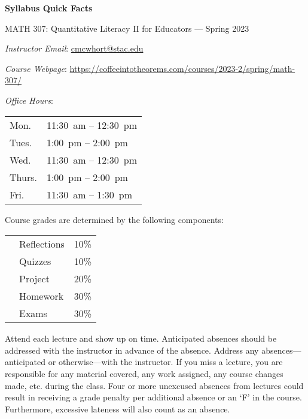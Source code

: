 \documentclass[11pt,letterpaper]{article}
\begin{document}
\begin{center} 
\bfseries
\color{stacred}
\LARGE Syllabus Quick Facts \par\vspace{0.2\baselineskip}
\Large MATH 307: Quantitative Literacy II for Educators --- Spring 2023
\end{center} 


\hspace{0.53cm} {\itshape Instructor Email}: \href{mailto:cmcwhort@stac.edu}{cmcwhort@stac.edu} \par
\hspace{0.53cm} {\itshape Course Webpage}: \href{https://coffeeintotheorems.com/courses/2023-2/spring/math-307/}{https://coffeeintotheorems.com/courses/2023-2/spring/math-307/} \par
\hspace{0.53cm} {\itshape Office Hours}: 	\par \vspace{-0.3cm}
	\begin{table}[!ht]
	\centering
	\begin{tabular}{l || l}
	Mon. & 11:30~am -- 12:30~pm \\
	Tues. & 1:00~pm -- 2:00~pm \\
	Wed. & 11:30~am -- 12:30~pm \\
	Thurs. & 1:00~pm -- 2:00~pm \\
	Fri. & 11:30~am -- 1:30~pm
	\end{tabular}
	\end{table} 


Course grades are determined by the following components: \par \vspace{-0.3cm}
	\begin{table}[!ht]
        \begin{tabular}{clr}
        & Reflections & 10\% \\
        & Quizzes & 10\% \\
        & Project & 20\% \\
        & Homework & 30\% \\
        & Exams & 30\% 
        \end{tabular} 
        \end{table}


Attend each lecture and show up on time. Anticipated absences should be addressed with the instructor in advance of the absence. Address any absences---anticipated or otherwise---with the instructor. If you miss a lecture, you are responsible for any material covered, any work assigned, any course changes made, etc. during the class. Four or more unexcused absences from lectures could result in receiving a grade penalty per additional absence or an `F' in the course. Furthermore, excessive lateness will also count as an absence. \pspace
\end{document}
